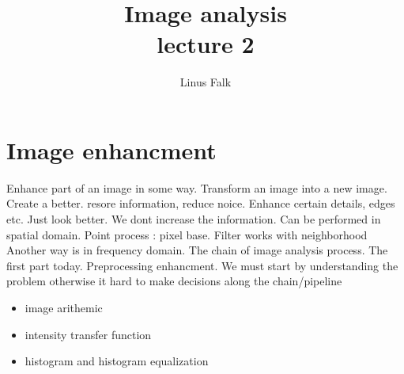 \documentclass[a4paper]{article}
\title{Image analysis \\ lecture 2}
\author{Linus Falk}
\begin{document}
\maketitle
\section{Image enhancment}
Enhance part of an image in some way. Transform an image into a new image. Create a better. resore information, reduce noice.
Enhance certain details, edges etc. Just look better. 
We dont increase the information. Can be performed in spatial domain. Point process : pixel base. Filter works with neighborhood
Another way is in frequency domain. 
The chain of image analysis process. The first part today. Preprocessing enhancment. We must start by understanding the problem otherwise it hard to make decisions along the chain/pipeline


\begin{itemize}
    \item image arithemic
    \item intensity transfer function
    \item histogram and histogram equalization
\end{itemize}




\end{document}
